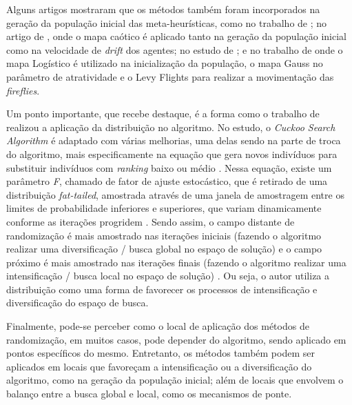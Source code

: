 Alguns artigos mostraram que os métodos também foram incorporados na geração da população inicial das meta-heurísticas, como no trabalho de \cite{saida}; no artigo de \cite{suresh}, onde o mapa caótico é aplicado tanto na geração da população inicial como na velocidade de \textit{drift} dos agentes; no estudo de \cite{abro}; e no trabalho de \cite{chou3} onde o mapa Logístico é utilizado na inicialização da população, o mapa Gauss no parâmetro de atratividade e o Levy Flights para realizar a movimentação das \textit{fireflies}.

Um ponto importante, que recebe destaque, é a forma como o trabalho de \cite{wood} realizou a aplicação da distribuição no algoritmo. No estudo, o \textit{Cuckoo Search Algorithm} é adaptado com várias melhorias, uma delas sendo na parte de troca do algoritmo, mais especificamente na equação que gera novos indivíduos para substituir indivíduos com \textit{ranking} baixo ou médio \cite{wood}. Nessa equação, existe um parâmetro \textit{F}, chamado de fator de ajuste estocástico, que é retirado de uma distribuição \textit{fat-tailed}, amostrada através de uma janela de amostragem entre os limites de probabilidade inferiores e superiores, que variam dinamicamente conforme as iterações progridem \cite{wood}.
Sendo assim, o campo distante de randomização é mais amostrado nas iterações iniciais (fazendo o algoritmo realizar uma diversificação / busca global no espaço de solução) e o campo próximo é mais amostrado nas iterações finais (fazendo o algoritmo realizar uma intensificação / busca local no espaço de solução) \cite{wood}. Ou seja, o autor utiliza a distribuição como uma forma de favorecer os processos de intensificação e diversificação do espaço de busca.

Finalmente, pode-se perceber como o local de aplicação dos métodos de randomização, em muitos casos, pode depender do algoritmo, sendo aplicado em pontos específicos do mesmo. Entretanto, os métodos também podem ser aplicados em locais que favoreçam a intensificação ou a diversificação do algoritmo, como na geração da população inicial; além de locais que envolvem o balanço entre a busca global e local, como os mecanismos de ponte.



